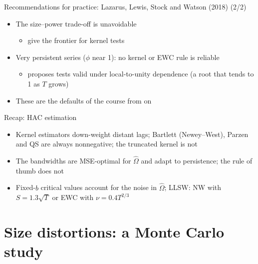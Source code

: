 \begin{frame}{Recommendations for practice: Lazarus, Lewis, Stock and Watson (2018) (2/2)}
\itemsize{\small}
\begin{itemize}
    \item The size--power trade-off is unavoidable
    \begin{itemize}
        \item {} give the frontier for kernel tests
    \end{itemize}
    \item Very persistent series ($\phi$ near 1): no kernel or EWC rule is reliable
    \begin{itemize}
        \item {} proposes tests valid under local-to-unity dependence (a root that tends to 1 as $T$ grows)
    \end{itemize}
    \item These are the defaults of the course from  on
\end{itemize}
\end{frame}

\begin{frame}{Recap: HAC estimation}
\itemsize{\small}
\begin{itemize}
    \item Kernel estimators down-weight distant lags; Bartlett (Newey--West), Parzen and QS are always nonnegative; the truncated kernel is not
    \item The  bandwidths are MSE-optimal for $\hat\Omega$ and adapt to persistence; the rule of thumb does not
    \item Fixed-$b$ critical values account for the noise in $\hat\Omega$; LLSW: NW with $S = 1.3\sqrt{T}$ or EWC with $\nu = 0.4T^{2/3}$
\end{itemize}
\end{frame}


\section{Size distortions: a Monte Carlo study}

